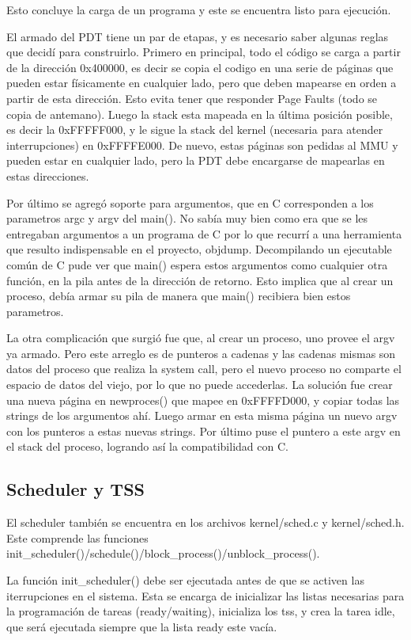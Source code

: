 Esto concluye la carga de un programa y este se encuentra listo para ejecución.

El armado del PDT tiene un par de etapas, y es necesario saber algunas reglas
que decidí para construirlo. Primero en principal, todo el código se carga a
partir de la dirección 0x400000, es decir se copia el codigo en una serie de
páginas que pueden estar físicamente en cualquier lado, pero que deben mapearse
en orden a partir de esta dirección. Esto evita tener que responder Page Faults
(todo se copia de antemano). Luego la stack esta mapeada en la última posición
posible, es decir la 0xFFFFF000, y le sigue la stack del kernel (necesaria para
atender interrupciones) en 0xFFFFE000. De nuevo, estas páginas son pedidas al
MMU y pueden estar en cualquier lado, pero la PDT debe encargarse de mapearlas
en estas direcciones.

Por último se agregó soporte para argumentos, que en C corresponden a los
parametros argc y argv del main(). No sabía muy bien como era que se les
entregaban argumentos a un programa de C por lo que recurrí a una
herramienta que resulto indispensable en el proyecto, objdump. Decompilando un
ejecutable común de C pude ver que main() espera estos argumentos como cualquier
otra función, en la pila antes de la dirección de retorno. Esto implica que al
crear un proceso, debía armar su pila de manera que main() recibiera bien estos
parametros.

La otra complicación que surgió fue que, al crear un proceso, uno provee el
argv ya armado. Pero este arreglo es de punteros a cadenas y las cadenas mismas
son datos del proceso que realiza la system call, pero el nuevo proceso no
comparte el espacio de datos del viejo, por lo que no puede accederlas. La
solución fue crear una nueva página en newproces() que mapee en 0xFFFFD000, y
copiar todas las strings de los argumentos ahí. Luego armar en esta misma
página un nuevo argv con los punteros a estas nuevas strings. Por último puse
el puntero a este argv en el stack del proceso, logrando así la compatibilidad
con C.

\subsection{Scheduler y TSS}

El scheduler también se encuentra en los archivos kernel/sched.c y
kernel/sched.h. Este comprende las funciones
init\_scheduler()/schedule()/block\_process()/unblock\_process().

La función init\_scheduler() debe ser ejecutada antes de que se activen las
iterrupciones en el sistema. Esta se encarga de inicializar las listas
necesarias para la programación de tareas (ready/waiting), inicializa los tss,
y crea la tarea idle, que será ejecutada siempre que la lista ready este vacía.

